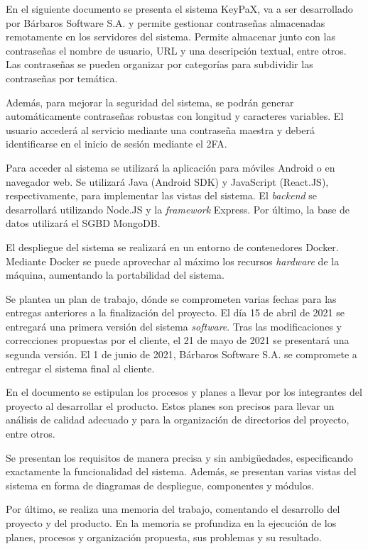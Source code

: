\documentclass{article}
\begin{document}
En el siguiente documento se presenta el sistema KeyPaX, va a ser desarrollado por Bárbaros Software S.A. y permite gestionar contraseñas almacenadas remotamente en los servidores del sistema. Permite almacenar junto con las contraseñas el nombre de usuario, URL y una descripción textual, entre otros. Las contraseñas se pueden organizar por categorías para subdividir las contraseñas por temática.
 
Además, para mejorar la seguridad del sistema, se podrán generar automáticamente contraseñas robustas con longitud y caracteres variables. El usuario accederá al servicio mediante una contraseña maestra y deberá identificarse en el inicio de sesión mediante el 2FA.
 
Para acceder al sistema se utilizará la aplicación para móviles Android o en navegador web. Se utilizará Java (Android SDK) y JavaScript (React.JS), respectivamente, para implementar las vistas del sistema. El \textit{backend} se desarrollará utilizando Node.JS y la \textit{framework} Express. Por último, la base de datos utilizará el SGBD MongoDB.
 
El despliegue del sistema se realizará en un entorno de contenedores Docker. Mediante Docker se puede aprovechar al máximo los recursos \textit{hardware} de la máquina, aumentando la portabilidad del sistema.
 
Se plantea un plan de trabajo, dónde se comprometen varias fechas para las entregas anteriores a la finalización del proyecto.  El día 15 de abril de 2021 se entregará una primera versión del sistema \textit{software}. Tras las modificaciones y correcciones propuestas por el cliente, el 21 de mayo de 2021 se presentará una segunda versión. El 1 de junio de 2021, Bárbaros Software S.A. se compromete a entregar el sistema final al cliente.
 
En el documento se estipulan los procesos y planes a llevar por los integrantes del proyecto al desarrollar el producto. Estos planes son precisos para llevar un análisis de calidad adecuado y para la organización de directorios del proyecto, entre otros.
 
Se presentan los requisitos de manera precisa y sin ambigüedades, especificando exactamente la funcionalidad del sistema. Además, se presentan varias vistas del sistema en forma de diagramas de despliegue, componentes y módulos.
 
Por último, se realiza una memoria del trabajo, comentando el desarrollo del proyecto y del producto. En la memoria se profundiza en la ejecución de los planes, procesos y organización propuesta, sus problemas y su resultado.
 
\end{document}
